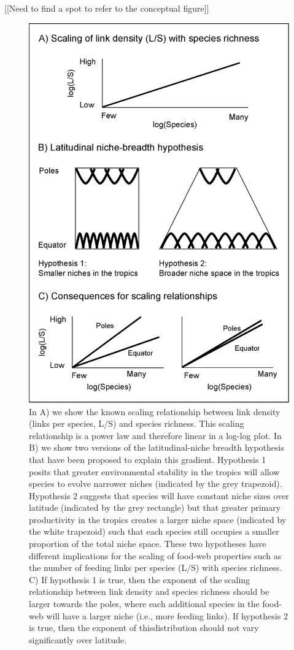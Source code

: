 \documentclass[12pt]{article}
\begin{document}
[[Need to find a spot to refer to the conceptual figure]]
\begin{figure}[h]
\centerline{\includegraphics*[height=.5\textheight]{Figures/Other/conceptual_figure.eps}}
\caption{In A) we show the known scaling relationship between link density (links per species, L/S) and 
species richness. This scaling relationship is a power law and therefore linear in a log-log plot.
In B) we show two versions of the latitudinal-niche breadth hypothesis that have been proposed to
explain this gradient. Hypothesis 1 posits that greater environmental stability in the tropics will 
allow species to evolve narrower niches (indicated by the grey trapezoid). Hypothesis 2 suggests that species
will have constant niche sizes over latitude (indicated by the grey rectangle) but that
greater primary productivity in the tropics creates a larger niche space (indicated by the 
white trapezoid) such that each species still occupies a smaller proportion of the total niche
space. These two hypotheses have different implications for the scaling of food-web properties
such as the number of feeding links per species (L/S) with species richness. C) If hypothesis 1 is 
true, then the exponent of the scaling relationship between link density and species richness should 
be larger towards the poles, where each additional species in the food-web will have a larger niche 
(i.e., more feeding links). If hypothesis 2 is true, then the exponent of thisdistribution should not vary significantly over latitude.}
\label{concept}
\end{figure}
\end{document}
